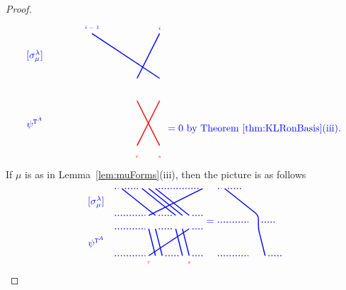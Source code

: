 \documentclass[twoside,11pt,reqno,letter]{amsart}
\numberwithin{equation}{section}
\theoremstyle{definition}  %
\newcommand{\0}{{\bar 0}}
\newcommand{\1}{{\bar 1}}
\newcommand{\la}{\lambda}
\newcommand{\si}{\sigma}
\def\T{{\mathtt T}}
\newenvironment{braid}{%
  \begin{tikzpicture}[baseline=6mm,blue,line width=1pt, scale=0.4,
                      draw/.append style={rounded corners},
                      every node/.append style={font=\tiny}]%
  }{\end{tikzpicture}
}
\begin{document}
{\begin{proof}
\[\begin{braid}
    \draw(3 ,10)node[above]{$i-1$}--(9,6);
      \draw[color=red](9,4)--(7,0); \draw[color=red](7,-1)node{$r$};
    \draw(9,10)node[above]{$i$}--(7,6);
      \draw[color=red](7,4)--(9,0); \draw[color=red](9,-1)node{$s$};

    \draw(-1,8)node[left,font=\normalsize]{$[\si^\la_\mu]$};
    \draw(-1,2)node[left,font=\normalsize]{$\psi^{\T^A}$};
  \end{braid}
  \begin{braid}\tikzset{scale=0.6,baseline=12mm}
    \draw(0,5)node[font=\normalsize]{$=0$ by Theorem~\ref{thm:KLRonBasis}(iii).};
  \end{braid}
\]
If $\mu$ is as in Lemma~\ref{lem:muForms}(iii), then the picture is as follows
\[
  \begin{braid}\tikzset{scale=0.6,baseline=12mm}
    \draw[dotted](0,10)--(0.5,10);
    \draw[dotted](0,6)--(4.5,6);
    \draw[dotted](0,4)--(4.5,4);
    \draw[dotted](0,0)--(4.5,0);

    \draw(1,10)--(6,6);
      \draw(6,4)--(7,0);

    \draw[dotted](1.5,10)--(3.5,10);
    \draw[dotted](6.5,6)--(8.5,6);
    \draw[dotted](6.5,4)--(8.5,4);
    \draw[dotted](7.5,0)--(9.5,0);

    \draw(4,10)--(9,6);
      \draw(9,4)--(10,0);
    \draw(5,10)--(10,6);
      \draw(10,4)--(11,0); \draw(11,-1)node[color=red]{$s$};
    \draw(6,10)--(11,6);
      \draw(11,4)--(5,0); \draw(5,-1)node[color=red]{$r$};

    \draw[dotted](6.5,10)--(12.5,10);

    \draw(13,10)--(5,6);
      \draw(5,4)--(6,0);

    \draw[dotted](11.5,6)--(13,6);
    \draw[dotted](11.5,4)--(13,4);
    \draw[dotted](11.5,0)--(13,0);

    \draw(-1,8)node[left,font=\normalsize]{$[\si^\la_\mu]$};
    \draw(-1,2)node[left,font=\normalsize]{$\psi^{\T^A}$};
  \end{braid}
  \begin{braid}\tikzset{scale=0.6,baseline=12mm}
    \draw(0,5)node[font=\normalsize]{$=$};
  \end{braid}
  \begin{braid}\tikzset{scale=0.6,baseline=12mm}
    \draw[dotted](0,10)--(0.5,10);
    \draw[dotted](0,5)--(4.5,5);
    \draw[dotted](0,0)--(4.5,0);

    \draw(1,10)--(6,6)--(6,4)--(7,0);

    \draw[dotted](1.5,10)--(3.5,10);
    \draw[dotted](6.5,5)--(8.5,5);
    \draw[dotted](7.5,0)--(9.5,0);


\end{braid}\]
\end{proof}}
\end{document}
